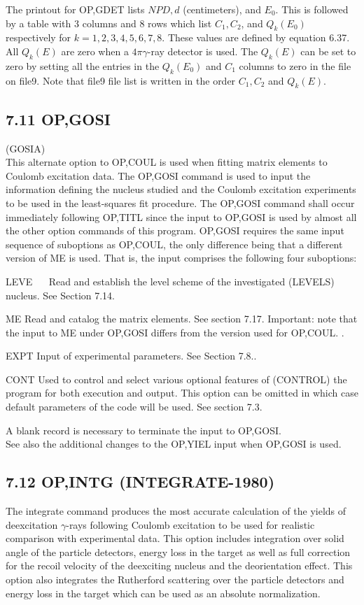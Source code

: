 \documentclass[10pt]{article}
\begin{document}
The printout for OP,GDET lists $N P D, d$ (centimeters), and $E_{0}$. This is followed by a table with 3 columns and 8 rows which list $C_{1}, C_{2}$, and $Q_{k}\left(E_{0}\right)$ respectively for $k=1,2,3,4,5,6,7,8$. These values are defined by equation 6.37. All $Q_{k}(E)$ are zero when a $4 \pi \gamma$-ray detector is used. The $Q_{k}(E)$ can be set to zero by setting all the entries in the $Q_{k}\left(E_{0}\right)$ and $C_{1}$ columns to zero in the file on file9. Note that file9 file list is written in the order $C_{1}, C_{2}$ and $Q_{k}(E)$.

\subsection*{7.11 OP,GOSI}
(GOSIA)\\
This alternate option to OP,COUL is used when fitting matrix elements to Coulomb excitation data. The OP,GOSI command is used to input the information defining the nucleus studied and the Coulomb excitation experiments to be used in the least-squares fit procedure. The OP,GOSI command shall occur immediately following OP,TITL since the input to OP,GOSI is used by almost all the other option commands of this program. OP,GOSI requires the same input sequence of suboptions as OP,COUL, the only difference being that a different version of ME is used. That is, the input comprises the following four suboptions:

LEVE $\quad$ Read and establish the level scheme of the investigated (LEVELS) nucleus. See Section 7.14.

ME Read and catalog the matrix elements. See section 7.17. Important: note that the input to ME under OP,GOSI differs from the version used for OP,COUL. .

EXPT Input of experimental parameters. See Section 7.8..

CONT Used to control and select various optional features of (CONTROL) the program for both execution and output. This option can be omitted in which case default parameters of the code will be used. See section 7.3.

A blank record is necessary to terminate the input to OP,GOSI.\\
See also the additional changes to the OP,YIEL input when OP,GOSI is used.

\subsection*{7.12 OP,INTG (INTEGRATE-1980)}
The integrate command produces the most accurate calculation of the yields of deexcitation $\gamma$-rays following Coulomb excitation to be used for realistic comparison with experimental data. This option includes integration over solid angle of the particle detectors, energy loss in the target as well as full correction for the recoil velocity of the deexciting nucleus and the deorientation effect. This option also integrates the Rutherford scattering over the particle detectors and energy loss in the target which can be used as an absolute normalization.
\end{document}
